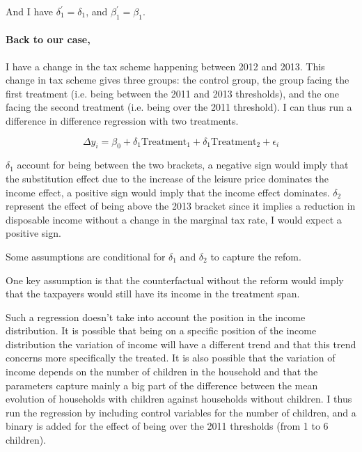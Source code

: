   And I have $\delta_1^' = \delta_1$, and $\beta^'_1 = \beta_1$.


  \paragraph{Back to our case,} I have a change in the tax scheme happening between 2012 and 2013. 
  This change in tax scheme gives three groups: the control group, the group facing the first treatment (i.e. being between the 2011 and 2013 thresholds), and the one facing the second treatment (i.e. being over the 2011 threshold).
  I can thus run a difference in difference regression with two treatments.

  \begin{equation}
  \label{eq:DD_simple}
  \Delta y_{i} =   \beta_0+ \delta_1 \text{Treatment}_1 + \delta_1 \text{Treatment}_2  + \epsilon_{i}
  \end{equation}

  $\delta_1$  account for being between the two brackets,  a negative sign would imply that the substitution effect due to the increase of the leisure price dominates the income effect, a positive sign would imply that the income effect dominates. $\delta_2$ represent the effect of being above the 2013 bracket since it implies a reduction in disposable income without a change in the marginal tax rate, I would expect a positive sign.

Some assumptions are conditional for $\delta_1$ and $\delta_2$ to capture the refom. 

One key assumption is that the counterfactual without the reform would imply that the taxpayers would still have its income in the treatment span.



  Such a regression doesn't take into account the position in the income distribution. It is possible that being on a specific position of the income distribution the variation of income will have a different trend and that this trend concerns more specifically the treated. It is also possible that the variation of income depends on the number of children in the household and that the parameters capture mainly a big part of the difference between the mean evolution of households with children against households without children.
  I thus run the regression by including control variables for the number of children, and a binary is added for the effect of being over the 2011 thresholds (from 1 to 6 children).



